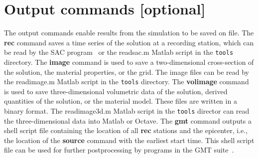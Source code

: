 \documentclass[11pt]{report}
\begin{document}
\section{Output commands [optional]}

The output commands enable results from the simulation to be saved on file. The {\bf rec} command
saves a time series of the solution at a recording station, which can be read by the SAC
program~\cite{Goldstein-et-al} or the readsac.m Matlab script in the {\tt tools} directory. The {\bf
  image} command is used to save a two-dimensional cross-section of the solution, the material
properties, or the grid. The image files can be read by the readimage.m Matlab script in the
{\tt tools} directory. The {\bf volimage} command is used to save three-dimensional volumetric data
of the solution, derived quantities of the solution, or the material model. These files are written
in a binary format. The readimage3d.m Matlab script in the {\tt tools} director can read the 
three-dimensional data into Matlab or Octave.
The {\bf gmt} command outputs a shell script file containing the location of all {\bf rec}
stations and the epicenter, i.e., the location of the {\bf source} command with the earliest start
time. This shell script file can be used for further postprocessing by programs in the GMT
suite~\cite{WesselSmithGMT}.
\end{document}
